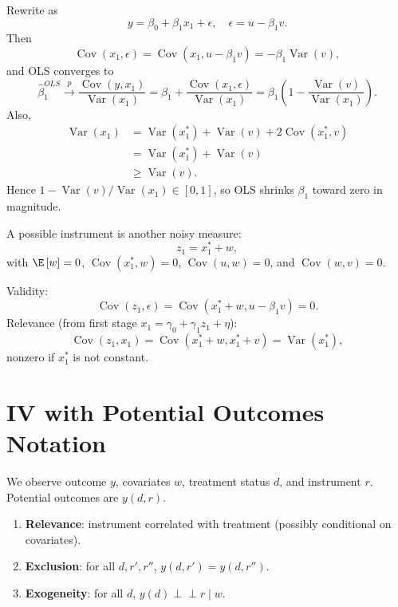 \begin{proposition}
	Rewrite as \[
		y = \beta_0 + \beta_1 x_1 + \epsilon, \quad \epsilon = u-\beta_1 v
	.\]
	Then \[
		\operatorname{Cov}(x_1,\epsilon)=\operatorname{Cov}(x_1,u-\beta_1 v)=-\beta_1\operatorname{Var}(v)
	,\]
	and OLS converges to \[
		\hat{\beta}_1^{OLS} \xrightarrow{p}  \frac{\operatorname{Cov}\left(y,x_1\right)}{\operatorname{Var}\left(x_1\right)} = \beta_1 + \frac{\operatorname{Cov}(x_1,\epsilon)}{\operatorname{Var}(x_1)} = \beta_1\left(1-\frac{\operatorname{Var}(v)}{\operatorname{Var}(x_1)}\right)
	.\]
	Also,
	\begin{align*}
		\operatorname{Var}(x_1)
		&= \operatorname{Var}(x_1^*) + \operatorname{Var}(v) + 2\operatorname{Cov}(x_1^*,v) \\
		&= \operatorname{Var}(x_1^*) + \operatorname{Var}(v) \\
		&\ge \operatorname{Var}(v)
	.\end{align*}
	Hence $1-\operatorname{Var}(v)/\operatorname{Var}(x_1)\in[0,1]$, so OLS shrinks $\beta_1$ toward zero in magnitude.
\end{proposition}

\begin{remark}
	A possible instrument is another noisy measure: \[
		z_1 = x_1^* + w
	,\]
	with $\E\left[w\right]=0$, $\operatorname{Cov}(x_1^*,w)=0$, $\operatorname{Cov}(u,w)=0$, and $\operatorname{Cov}(w,v)=0$.

	Validity: \[
		\operatorname{Cov}(z_1,\epsilon)=\operatorname{Cov}(x_1^*+w, u-\beta_1 v)=0
	.\]
	Relevance (from first stage $x_1=\gamma_0+\gamma_1 z_1+\eta$): \[
		\operatorname{Cov}(z_1,x_1)=\operatorname{Cov}(x_1^*+w, x_1^*+v)=\operatorname{Var}(x_1^*)
	,\]
	nonzero if $x_1^*$ is not constant.
\end{remark}

\section{IV with Potential Outcomes Notation}

\begin{definition}
	We observe outcome $y$, covariates $w$, treatment status $d$, and instrument $r$. Potential outcomes are $y(d,r)$.
	\begin{enumerate}[label=(\roman*)]
		\item \textbf{Relevance}: instrument correlated with treatment (possibly conditional on covariates).
		\item \textbf{Exclusion}: for all $d,r',r''$, $y(d,r')=y(d,r'')$.
		\item \textbf{Exogeneity}: for all $d$, $y(d) \perp\!\!\!\perp r \mid w$.
	\end{enumerate}
\end{definition}


